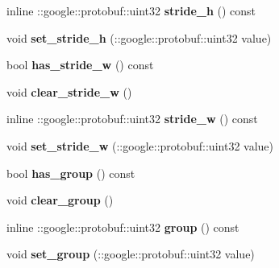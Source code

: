 \begin{DoxyCompactItemize}
inline \+::google\+::protobuf\+::uint32 {\bfseries stride\+\_\+h} () const
\item 
\mbox{\label{classcaffe_1_1_convolution_parameter_a16b40c0415f110947ef05e3039215f20}} 
void {\bfseries set\+\_\+stride\+\_\+h} (\+::google\+::protobuf\+::uint32 value)
\item 
\mbox{\label{classcaffe_1_1_convolution_parameter_a2d8cccd76e8e8e7e4b7deb41919fdf7c}} 
bool {\bfseries has\+\_\+stride\+\_\+w} () const
\item 
\mbox{\label{classcaffe_1_1_convolution_parameter_a505bf1f164618379b9e8b11965717aba}} 
void {\bfseries clear\+\_\+stride\+\_\+w} ()
\item 
\mbox{\label{classcaffe_1_1_convolution_parameter_a0f219b1fe2afcfb8784af22fae9f20f2}} 
inline \+::google\+::protobuf\+::uint32 {\bfseries stride\+\_\+w} () const
\item 
\mbox{\label{classcaffe_1_1_convolution_parameter_a195908395a776c7f21a14c73b562987d}} 
void {\bfseries set\+\_\+stride\+\_\+w} (\+::google\+::protobuf\+::uint32 value)
\item 
\mbox{\label{classcaffe_1_1_convolution_parameter_ad6a4cac0f2955e2cf7d2067b1ac31c52}} 
bool {\bfseries has\+\_\+group} () const
\item 
\mbox{\label{classcaffe_1_1_convolution_parameter_a1c418fc785e665184f99e459404d547e}} 
void {\bfseries clear\+\_\+group} ()
\item 
\mbox{\label{classcaffe_1_1_convolution_parameter_abf0a4d46f587b7fbe965bbd9e412d3e4}} 
inline \+::google\+::protobuf\+::uint32 {\bfseries group} () const
\item 
\mbox{\label{classcaffe_1_1_convolution_parameter_af4e1c10369d4355de07e1f6f1283b572}} 
void {\bfseries set\+\_\+group} (\+::google\+::protobuf\+::uint32 value)
\item 

\end{DoxyCompactItemize}
